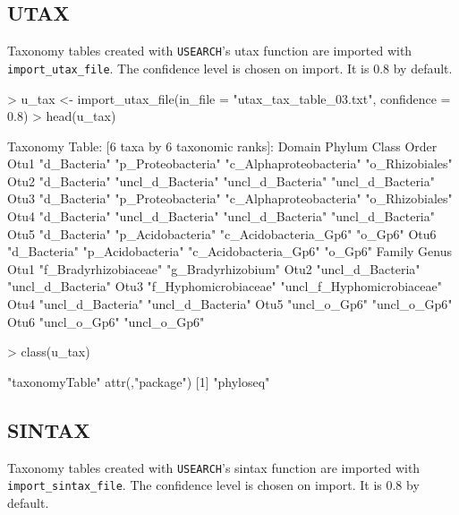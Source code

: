 \documentclass{article}
\begin{document}
\subsection*{UTAX}

Taxonomy tables created with \texttt{USEARCH}'s utax function are imported with \texttt{import\_utax\_file}. The confidence level is chosen on import. It is 0.8 by default.  

\begin{Schunk}
\begin{Sinput}
> u_tax <- import_utax_file(in_file = "utax_tax_table_03.txt", confidence = 0.8)
> head(u_tax)
\end{Sinput}
\begin{Soutput}
Taxonomy Table:     [6 taxa by 6 taxonomic ranks]:
     Domain       Phylum             Class                   Order            
Otu1 "d_Bacteria" "p_Proteobacteria" "c_Alphaproteobacteria" "o_Rhizobiales"  
Otu2 "d_Bacteria" "uncl_d_Bacteria"  "uncl_d_Bacteria"       "uncl_d_Bacteria"
Otu3 "d_Bacteria" "p_Proteobacteria" "c_Alphaproteobacteria" "o_Rhizobiales"  
Otu4 "d_Bacteria" "uncl_d_Bacteria"  "uncl_d_Bacteria"       "uncl_d_Bacteria"
Otu5 "d_Bacteria" "p_Acidobacteria"  "c_Acidobacteria_Gp6"   "o_Gp6"          
Otu6 "d_Bacteria" "p_Acidobacteria"  "c_Acidobacteria_Gp6"   "o_Gp6"          
     Family                Genus                     
Otu1 "f_Bradyrhizobiaceae" "g_Bradyrhizobium"        
Otu2 "uncl_d_Bacteria"     "uncl_d_Bacteria"         
Otu3 "f_Hyphomicrobiaceae" "uncl_f_Hyphomicrobiaceae"
Otu4 "uncl_d_Bacteria"     "uncl_d_Bacteria"         
Otu5 "uncl_o_Gp6"          "uncl_o_Gp6"              
Otu6 "uncl_o_Gp6"          "uncl_o_Gp6"              
\end{Soutput}
\begin{Sinput}
> class(u_tax)
\end{Sinput}
\begin{Soutput}
[1] "taxonomyTable"
attr(,"package")
[1] "phyloseq"
\end{Soutput}
\end{Schunk}

\subsection*{SINTAX}

Taxonomy tables created with \texttt{USEARCH}'s sintax function are imported with \texttt{import\_sintax\_file}. The confidence level is chosen on import. It is 0.8 by default.  
\end{document}
